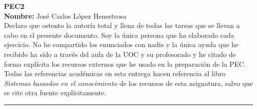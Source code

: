 \documentclass[11pt, a4paper]{article}
\begin{document}
	\begin{center}
		\Large{ \textbf{PEC2} } \\
		\vspace{0.5cm}
		\normalsize{\textbf{Nombre:} José Carlos López Henestrosa} \\
		\vspace{0.5cm}
		\normalsize{Declaro que ostento la autoría total y llena de todas las tareas que se llevan a cabo en el presente documento. Soy la única persona que ha elaborado cada ejercicio. No he compartido los enunciados con nadie y la única ayuda que he recibido ha sido a través del aula de la UOC y su profesorado y he citado de forma explícita los recursos externos que he usado en la preparación de la PEC.} \\
		\vspace{0.5cm}
		\normalsize{Todas las referencias académicas en esta entrega hacen referencia al libro \textit{Sistemas basasdos en el conocimiento} de los recursos de esta asignatura, salvo que se cite otra fuente explícitamente.}
	\end{center}

	\vspace{1cm}
	\hrule
	\vspace{1cm}
\end{document}
